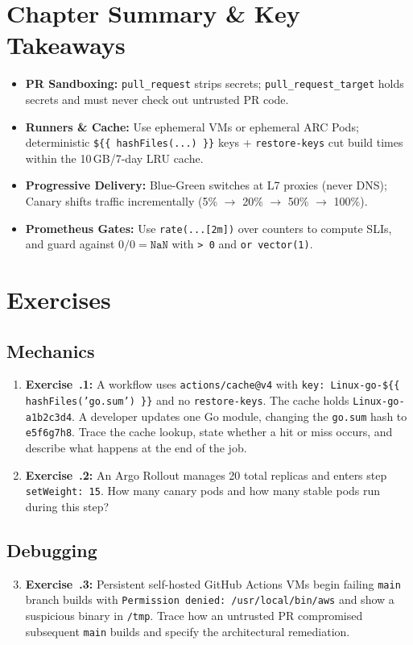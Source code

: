\section{Chapter Summary \protect\& Key Takeaways}
\begin{itemize}[leftmargin=15pt]
  \item \textbf{PR Sandboxing:} \texttt{pull\_request} strips secrets; \texttt{pull\_request\_target} holds secrets and must never check out untrusted PR code.
  \item \textbf{Runners \& Cache:} Use ephemeral VMs or ephemeral ARC Pods; deterministic \texttt{\$\{\{ hashFiles(...) \}\}} keys + \texttt{restore-keys} cut build times within the 10\,GB/7-day LRU cache.
  \item \textbf{Progressive Delivery:} Blue-Green switches at L7 proxies (never DNS); Canary shifts traffic incrementally (5\% $\to$ 20\% $\to$ 50\% $\to$ 100\%).
  \item \textbf{Prometheus Gates:} Use \texttt{rate(...[2m])} over counters to compute SLIs, and guard against $0/0 = \texttt{NaN}$ with \texttt{> 0} and \texttt{or vector(1)}.
\end{itemize}

\section{Exercises}

\subsection{Mechanics}
\begin{enumerate}[leftmargin=18pt]
  \item \textbf{Exercise~\thechapter.1:} A workflow uses \texttt{actions/cache@v4} with \texttt{key: Linux-go-\$\{\{ hashFiles('go.sum') \}\}} and no \texttt{restore-keys}. The cache holds \texttt{Linux-go-a1b2c3d4}. A developer updates one Go module, changing the \texttt{go.sum} hash to \texttt{e5f6g7h8}. Trace the cache lookup, state whether a hit or miss occurs, and describe what happens at the end of the job.
  \item \textbf{Exercise~\thechapter.2:} An Argo Rollout manages 20 total replicas and enters step \texttt{setWeight: 15}. How many canary pods and how many stable pods run during this step?
\end{enumerate}

\subsection{Debugging}
\begin{enumerate}[leftmargin=18pt]
  \setcounter{enumi}{2}
  \item \textbf{Exercise~\thechapter.3:} Persistent self-hosted GitHub Actions VMs begin failing \texttt{main} branch builds with \texttt{Permission denied: /usr/local/bin/aws} and show a suspicious binary in \texttt{/tmp}. Trace how an untrusted PR compromised subsequent \texttt{main} builds and specify the architectural remediation.
\end{enumerate}

